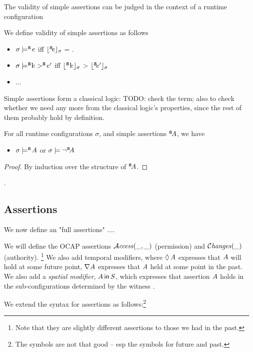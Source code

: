 The validity of simple assertions can be judged in the context of a runtime configuration

 \begin{definition}
We define validity of simple assertions as follows

\begin{itemize}
\item
$\sigma \models ^{\small{{\mbox{\tt{s}}}}}\!e$ iff ${\lfloor{ {\ensuremath{^{\small{{\mbox{\tt{s}}}}}\!e}}}\rfloor_{\sigma}}$ = .
\item
$\sigma \models ^{\small{{\mbox{\tt{s}}}}}!\!e>^{\small{{\mbox{\tt{s}}}}}\!e'$ iff ${\lfloor{ {\ensuremath{^{\small{{\mbox{\tt{s}}}}}!\!e}}}\rfloor_{\sigma}}$ > ${\lfloor{ {\ensuremath{^{\small{{\mbox{\tt{s}}}}}\!e'}}}\rfloor_{\sigma}}$
\item
...
\end{itemize}
\end{definition}

Simple assertions form a classical logic: TODO: check the term; also to check whether we need any more from the classical logic's properties, since the rest of them probably hold by definition.

\begin{lemma}
For all runtime configurations $\sigma$, and simple assertions $^{\small{{\mbox{\tt{s}}}}}\!A$, we have
\begin{itemize}
\item
$\sigma \models ^{\small{{\mbox{\tt{s}}}}}\!A$ or $\sigma \models \neg^{\small{{\mbox{\tt{s}}}}}\!A$
\end{itemize}
\end{lemma}
\begin{proof} By induction over the structure of $^{\small{{\mbox{\tt{s}}}}}\!A$. \end{proof}.
 
 \subsection{Assertions}

We now define an "full assertions" ....

We will define the OCAP assertions ${\mathcal{A}}\textrm{\textit{ccess}}(\_,\_)$  (permission)
and   $\mathcal{C}\textrm{\textit{hanges}}(\_)$ (authority). \footnote{Note that they are slightly different
assertions to those we had in the past.}
We also add temporal modifiers, where $\lozenge\, A$ expresses that $A$ will hold at some future point,
$\nabla A$ expresses that $A$ held at some point in the past.
We also add a {\em spatial modifier}, $A\,{\bf{\sf {in}}}\, S$, which expresses that assertion $A$ holds in
the sub-configurations determined by the witness .

We extend the syntax for assertions as follows:\footnote{The symbols are not that good -- esp the symbols for future and past.}

